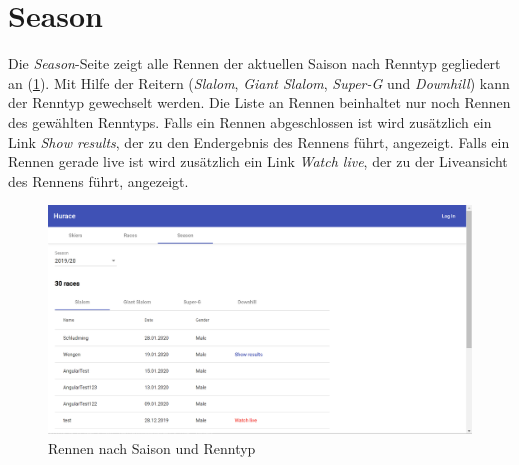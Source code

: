 \newpage
\section{Season}
Die \emph{Season}-Seite zeigt alle Rennen der aktuellen Saison nach Renntyp gegliedert an (\cref{fig:season-list}).
Mit Hilfe der Reitern (\emph{Slalom}, \emph{Giant Slalom}, \emph{Super-G} und \emph{Downhill}) kann der Renntyp gewechselt werden.
Die Liste an Rennen beinhaltet nur noch Rennen des gewählten Renntyps.
Falls ein Rennen abgeschlossen ist wird zusätzlich ein Link \emph{Show results}, der zu den Endergebnis des Rennens führt, angezeigt.
Falls ein Rennen gerade live ist wird zusätzlich ein Link \emph{Watch live}, der zu der Liveansicht des Rennens führt, angezeigt.

\begin{figure}[H]
    \centering
    \includegraphics[width=0.9\linewidth]{images/season-list}
    \caption{Rennen nach Saison und Renntyp}
\label{fig:season-list}
\end{figure}